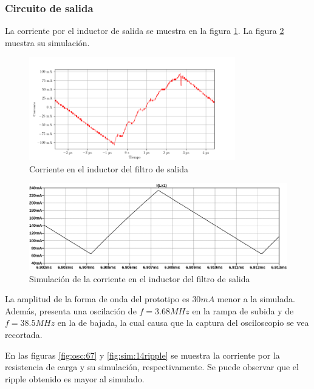 \subsubsection{Circuito de salida}

La corriente por el inductor de salida se muestra en la figura \ref{fig:osc:66}. La figura \ref{fig:sim:13} muestra su simulación.

\begin{figure}[H]
    \centering
    \includegraphics[width=0.8\textwidth]{images/capturas-osciloscopio/17-11-2022/66.png}
    \caption{Corriente en el inductor del filtro de salida}
    \label{fig:osc:66}
\end{figure}

\begin{figure}[H]
    \centering
    \includegraphics[width=\textwidth]{images/sim/13.pdf}
    \caption{Simulación de la corriente en el inductor del filtro de salida}
    \label{fig:sim:13}
\end{figure}

La amplitud de la forma de onda del prototipo es $30mA$ menor a la simulada. 
Además, presenta una oscilación de $f=3.68MHz$ en la rampa de subida y de $f=38.5MHz$ en la de bajada, la cual causa que la captura del osciloscopio se vea recortada. 

En las figuras \ref{fig:osc:67} y \ref{fig:sim:14ripple} se muestra la corriente por la resistencia de carga y su simulación, respectivamente. Se puede observar que el ripple obtenido es mayor al simulado.

